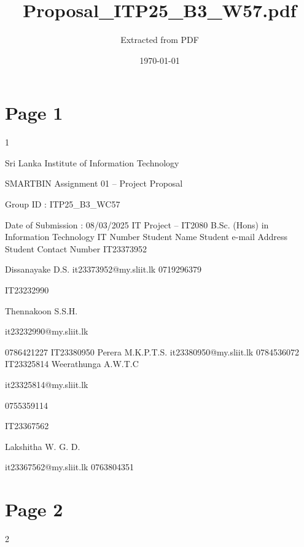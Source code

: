 \documentclass{article}
\title{Proposal\_ITP25\_B3\_W57.pdf}
\author{Extracted from PDF}
\date{\today}
\begin{document}
\maketitle

\section*{Page 1}
   
 
 1  
 
Sri Lanka Institute of Information Technology 
 
SMARTBIN 
Assignment 01 – Project Proposal  
 
Group ID :  ITP25\_B3\_WC57 
 
Date of Submission : 08/03/2025 
IT Project – IT2080 
B.Sc. (Hons) in Information Technology 
IT Number Student Name Student e-mail Address Student Contact 
Number 
IT23373952 
 
Dissanayake D.S. it23373952@my.sliit.lk 0719296379 
 
IT23232990 
 
Thennakoon S.S.H. 
 
it23232990@my.sliit.lk 
 
0786421227 
IT23380950 Perera M.K.P.T.S. it23380950@my.sliit.lk 0784536072 
IT23325814  Weerathunga A.W.T.C 
 
it23325814@my.sliit.lk 
 
0755359114 
 
IT23367562 
 
Lakshitha W. G. D. 
 
it23367562@my.sliit.lk 0763804351 


\section*{Page 2}
   
 
 2  
 
\end{document}
